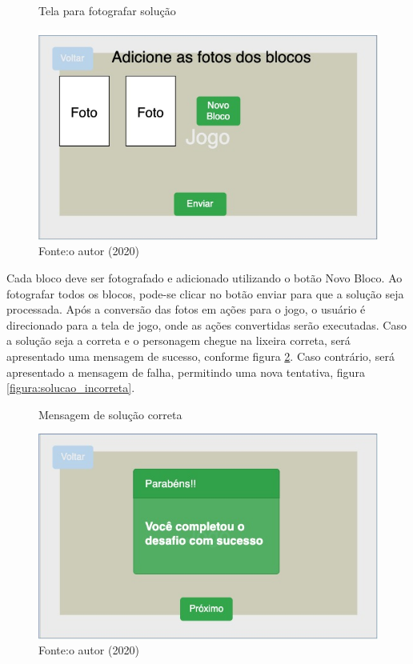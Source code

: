     \begin{figure}[h!]
        \centering
        \caption{Tela para fotografar solução}
        \includegraphics[width=12cm]{images/cap3/Fotografar_blocos.jpg}
        \caption*{Fonte:o autor (2020)}
        \label{figura:fotografar_blocos}
    \end{figure}
    
    Cada bloco deve ser fotografado e adicionado utilizando o botão Novo Bloco.
    Ao fotografar todos os blocos, pode-se clicar no botão enviar para que a solução seja processada.
    Após a conversão das fotos em ações para o jogo, o usuário é direcionado para a tela de jogo, onde as ações convertidas serão executadas.
    Caso a solução seja a correta e o personagem chegue na lixeira correta, será apresentado uma mensagem de sucesso, conforme figura \ref{figura:solucao_correta}. Caso contrário, será apresentado a mensagem de falha, permitindo uma nova tentativa, figura \ref{figura:solucao_incorreta}.
    
    \begin{figure}[h!]
        \centering
        \caption{Mensagem de solução correta}
        \includegraphics[width=12cm]{images/cap3/solucao_correta.jpg}
        \caption*{Fonte:o autor (2020)}
        \label{figura:solucao_correta}
    \end{figure}
    
